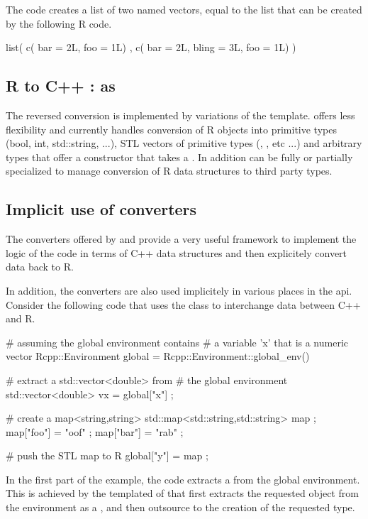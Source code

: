 The code creates a list of two named vectors, equal to the list that 
can be created by the following R code. 

\begin{example}
list( 
  c( bar = 2L, foo = 1L) , 
  c( bar = 2L, bling = 3L, foo = 1L) )
\end{example}

\subsection{R to C++ : as}

The reversed conversion is implemented by variations of the 
 template.  offers less flexibility and currently
handles conversion of R objects into primitive types (bool, int, std::string, ...), 
STL vectors of primitive types  (, 
, etc ...) and arbitrary types that offer 
a constructor that takes a . In addition  can 
be fully or partially specialized to manage conversion of R data 
structures to third party types.

\subsection{Implicit use of converters}

The converters offered by  and  provide a very 
useful framework to implement the logic of the code in terms of C++ 
data structures and then explicitely convert data back to R. 

In addition, the converters are also used implicitely
in various places in the  api. 
Consider the following code that uses the  class to 
interchange data between C++ and R.

\begin{example}
# assuming the global environment contains 
# a variable 'x' that is a numeric vector
Rcpp::Environment global = 
	Rcpp::Environment::global_env()

# extract a std::vector<double> from 
# the global environment
std::vector<double> vx = global["x"] ;

# create a map<string,string>
std::map<std::string,std::string> map ;
map["foo"] = "oof" ;
map["bar"] = "rab" ;

# push the STL map to R
global["y"] = map ;
\end{example}

In the first part of the example, the code extracts a 
 from the global environment. This is 
achieved by the templated  of 
that first extracts the requested object from the environment as a , 
and then outsource to  the creation of the 
requested type. 

